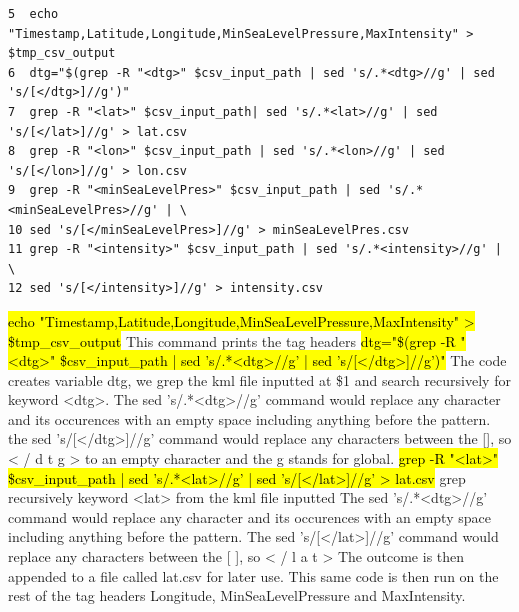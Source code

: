 \documentclass[]{article}
\begin{document}
\begin{tcolorbox}[colback=white, colframe=black, boxrule=0.5pt, arc=2mm, 
    title=Second part of the code, width=6.7in, fonttitle=\bfseries, listing only, listing options={language=sh, basicstyle=\ttfamily}]
    \begin{verbatim}
5  echo "Timestamp,Latitude,Longitude,MinSeaLevelPressure,MaxIntensity" > $tmp_csv_output
6  dtg="$(grep -R "<dtg>" $csv_input_path | sed 's/.*<dtg>//g' | sed 's/[</dtg>]//g')"
7  grep -R "<lat>" $csv_input_path| sed 's/.*<lat>//g' | sed 's/[</lat>]//g' > lat.csv
8  grep -R "<lon>" $csv_input_path | sed 's/.*<lon>//g' | sed 's/[</lon>]//g' > lon.csv
9  grep -R "<minSeaLevelPres>" $csv_input_path | sed 's/.*<minSeaLevelPres>//g' | \
10 sed 's/[</minSeaLevelPres>]//g' > minSeaLevelPres.csv
11 grep -R "<intensity>" $csv_input_path | sed 's/.*<intensity>//g' | \ 
12 sed 's/[</intensity>]//g' > intensity.csv
    \end{verbatim}
\hl{echo "Timestamp,Latitude,Longitude,MinSeaLevelPressure,MaxIntensity" > \$tmp\_csv\_output}\newline
This command prints the tag headers\newline
\hl{dtg="\$(grep -R "<dtg>" \$csv\_input\_path | sed 's/.*<dtg>//g' | sed 's/[</dtg>]//g')"}\newline
The code creates variable dtg, we grep the kml file inputted at \$1 and search recursively for\newline
keyword <dtg>. The sed 's/.*<dtg>//g' command would replace any character and its occurences \newline
with an empty space including anything before the pattern.\newline
the sed 's/[</dtg>]//g' command would replace any characters between the [], so < / d t g >\newline
to an empty character and the g stands for global.\newline
\hl{grep -R "<lat>" \$csv\_input\_path | sed 's/.*<lat>//g' | sed 's/[</lat>]//g' > lat.csv}\newline
grep recursively keyword <lat> from the kml file inputted\newline
The sed 's/.*<dtg>//g' command would replace any character and its occurences \newline
with an empty space including anything before the pattern.\newline
The sed 's/[</lat>]//g' command would replace any characters between the [ ], so < / l a t >\newline
The outcome is then appended to a file called lat.csv for later use. This same code is then run\newline
on the rest of the tag headers Longitude, MinSeaLevelPressure and MaxIntensity.\newline


\end{tcolorbox}
\end{document}
